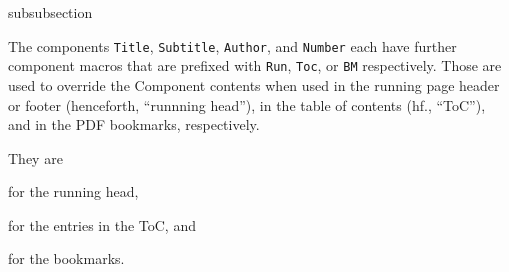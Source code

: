\begin{Heading}[label=sec:hdg:comp:overrides]{subsubsection}
\end{Heading}

The components \lstinline{Title},
\lstinline{Subtitle},
\lstinline{Author}, and \lstinline{Number}
each have further component macros that are prefixed with
\lstinline{Run}, \lstinline{Toc}, or \lstinline{BM}
respectively. Those are used to override the
Component contents when used in the running page header or footer
(henceforth, “runnning head”), in the table of contents (hf.,
“ToC”), and in the PDF bookmarks, respectively.

They are
\begin{description}
\item[\string\RunTitle]
\item[\string\RunSubtitle]
\item[\string\RunAuthor]
\item[\string\RunNumber]
\end{description}
for the running head,
\begin{description}
\item[\string\TocTitle]
\item[\string\TocSubtitle]
\item[\string\TocAuthor]
\item[\string\TocNumber]
\end{description}
for the entries in the ToC, and
\begin{description}
\item[\string\BMTitle]
\item[\string\BMSubtitle]
\item[\string\BMAuthor]
\item[\string\BMNumber]
\end{description}
for the bookmarks.

